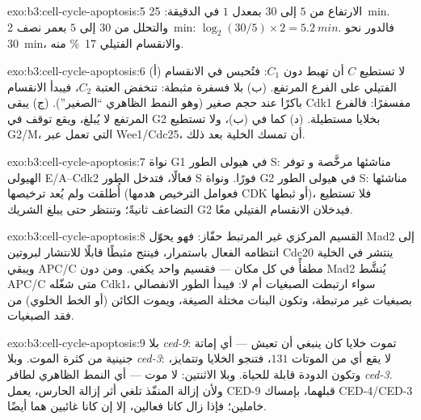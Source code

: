 \begin{solution}{exo:b3:cell-cycle-apoptosis:5}
الارتفاع من $5$ إلى $30$ بمعدل $1$ في الدقيقة: \qty{25}{min}. والتحلل من
$30$ إلى $5$ بعمر نصف \qty{2}{min}: $\log_{2}(30/5)\times 2 =
\qty{5.2}{min}$. فالدور نحو \qty{30}{min}، والانقسام الفتيلي \qty{17}{\%} منه.
\end{solution}

\begin{solution}{exo:b3:cell-cycle-apoptosis:6}
(أ) لا تستطيع $C$ أن تهبط دون $C_{1}$: فتُحبس في الانقسام الفتيلي على الفرع
المرتفع. (ب) بلا فسفرة مثبطة: تنخفض العتبة $C_{2}$،
فيبدأ الانقسام باكرًا عند حجم صغير (وهو النمط الظاهري ``الصغير'').
(ج) يبقى Cdk1 مفسفرًا: فالفرع المرتفع لا يُبلغ، ويقع توقف في
G2 بخلايا مستطيلة. (د) كما في (ب)، ولا تستطيع  G2/M، التي تعمل
عبر Wee1/Cdc25، أن تمسك الخلية بعد ذلك.
\end{solution}

\begin{solution}{exo:b3:cell-cycle-apoptosis:7}
نواة G1 في هيولى الطور S: مناشئها مرخَّصة و
توفر الهيولى  E/A--Cdk2 فعالًا، فتدخل الطور S فورًا. ونواة
G2 في هيولى الطور S: مناشئها أُطلقت ولم يُعد
ترخيصها (فعوامل الترخيص هدمها CDK أو ثبطها)، فلا
تستطيع التضاعف ثانيةً؛ وتنتظر حتى يبلغ الشريك G2 فيدخلان
الانقسام الفتيلي معًا.
\end{solution}

\begin{solution}{exo:b3:cell-cycle-apoptosis:8}
القسيم المركزي غير المرتبط حفّاز: فهو يحوّل Mad2 إلى انتظامه
الفعال باستمرار، فينتج مثبطًا قابلًا للانتشار لبروتين Cdc20
ينتشر في الخلية ويبقي APC/C مطفأً في كل مكان
--- فقسيم واحد يكفي. ومن دون Mad2 يُنشَّط APC/C
متى شغّله Cdk1، سواء ارتبطت الصبغيات أم لا:
فيبدأ الطور الانفصالي بصبغيات غير مرتبطة، وتكون البنات
مختلة الصيغة، ويموت الكائن (أو الخط الخلوي) من فقد الصبغيات.
\end{solution}

\begin{solution}{exo:b3:cell-cycle-apoptosis:9}
بلا \emph{ced-9}: تموت خلايا كان ينبغي أن تعيش --- أي إماتة جنينية
من كثرة الموت. وبلا \emph{ced-3}: لا يقع أي من الموتات $131$،
فتنجو الخلايا وتتمايز، وتكون الدودة قابلة للحياة. وبلا الاثنتين: لا موت
--- أي النمط الظاهري لطافر \emph{ced-3}. ولأن إزالة المنفّذ تلغي
أثر إزالة الحارس، يعمل CED-9 قبلهما، بإمساك
CED-4/CED-3 خاملين؛ فإذا زال كانا فعالين، إلا إن كانا
غائبين هما أيضًا.
\end{solution}

